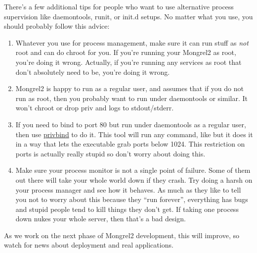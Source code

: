 There's a few additional tips for people who want to use alternative process supervision
like daemontools, runit, or init.d setups.  No matter what you use, you should probably
follow this advice:

\begin{enumerate}
\item Whatever you use for process management, make sure it can run stuff as \emph{not} root
and can do chroot for you.  If you're running your Mongrel2 as root, you're doing it wrong.
Actually, if you're running any services as root that don't absolutely need to be, you're doing
it wrong.

\item Mongrel2 is happy to run as a regular user, and assumes that if you do not run as root,
then you probably want to run under daemontools or similar.  It won't chroot or drop priv and
logs to stdout/stderr.

\item If you need to bind to port 80 but run under daemontools as a regular user, then use
\href{http://manpages.ubuntu.com/manpages/lucid/man1/privbind.1.html}{privbind} to do it.
This tool will run any command, like  but it does it in a way that lets the
executable grab ports below 1024.  This restriction on ports is actually really stupid so
don't worry about doing this.

\item Make sure your process monitor is not a single point of failure.  Some of
them out there will take your whole world down if they crash.  Try doing a
harsh  on your process manager and see how it behaves.  As much as
they like to tell you not to worry about this because they ``run forever'',
everything has bugs and stupid people tend to kill things they don't get.
If taking one process down nukes your whole server, then that's a bad
design.

\end{enumerate}

As we work on the next phase of Mongrel2 development, this will improve, so watch for
news about deployment and real applications.
